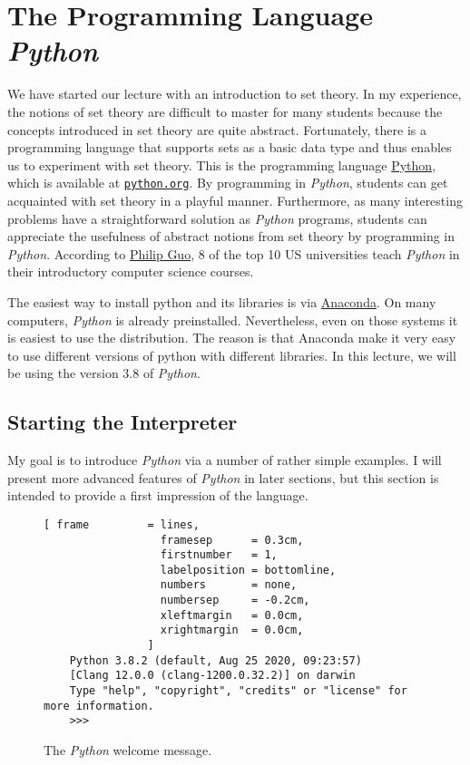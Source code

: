 \chapter{The Programming Language \textsl{Python}}
We have started our lecture with an introduction to set theory.  In my experience, the notions of
set theory are difficult to master for many students because the concepts introduced in set theory
are quite abstract.  Fortunately, there is a programming language that supports sets as a basic data type and
thus enables us to experiment with set theory.  This is the programming language
\href{https://en.wikipedia.org/wiki/Python_(programming_language)}{Python}, which is available at
\href{http://www.python.org}{\texttt{python.org}}. 
By programming in \textsl{Python}, students can get acquainted with set theory in a playful manner.
Furthermore, as many interesting problems have a straightforward solution as \textsl{Python} programs,
students can appreciate the usefulness of abstract notions from set theory by programming in \textsl{Python}.
According to 
\href{https://cacm.acm.org/blogs/blog-cacm/176450-python-is-now-the-most-popular-introductory-teaching-language-at-top-u-s-universities/fulltext}{Philip Guo},
8 of the top 10 US universities teach \textsl{Python} in their introductory computer science courses.

The easiest way to install python and its libraries is via \href{https://www.anaconda.com/download/}{Anaconda}.
On many computers, \textsl{Python} is already preinstalled.  Nevertheless, even on those systems it is easiest
to use the  distribution.  The reason is that Anaconda make it very easy to use different
versions of python with different libraries.  In this lecture, we will be using the version 3.8 of \textsl{Python}.

\section{Starting the Interpreter}
My goal is to introduce \textsl{Python} via a number of rather simple examples.  I will present more
advanced features of \textsl{Python} in later sections, but this section is intended to provide a first
impression of the language.


\begin{figure}[!ht]
\centering
\begin{Verbatim}[ frame         = lines, 
                  framesep      = 0.3cm, 
                  firstnumber   = 1,
                  labelposition = bottomline,
                  numbers       = none,
                  numbersep     = -0.2cm,
                  xleftmargin   = 0.0cm,
                  xrightmargin  = 0.0cm,
                ]
    Python 3.8.2 (default, Aug 25 2020, 09:23:57) 
    [Clang 12.0.0 (clang-1200.0.32.2)] on darwin
    Type "help", "copyright", "credits" or "license" for more information.
    >>> 
\end{Verbatim}
\vspace*{-0.3cm}
\caption{The \textsl{Python} welcome message.}
\label{fig:python}
\end{figure}

